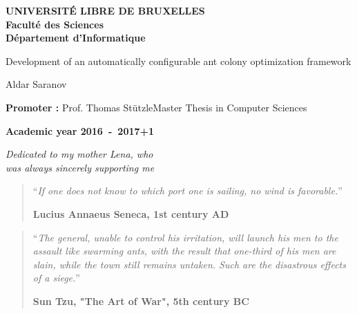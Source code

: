 \documentclass[11pt,a4paper,oneside]{book}
\begin{document}
\frontmatter
\begin{titlepage}
\begin{center}
\textbf{UNIVERSIT\'E LIBRE DE BRUXELLES}\\
\textbf{Facult\'e des Sciences}\\
\textbf{D\'epartement d'Informatique}
\vfill{}\vfill{}

{\Huge  Development of an automatically configurable ant colony optimization framework}

{\Huge \par}
\begin{center}{\LARGE Aldar Saranov}\end{center}{\Huge \par}
\vfill{}\vfill{}
\begin{flushright}{\large \textbf{Promoter :} Prof. Thomas St{\"u}tzle}\hfill{}{\large Master Thesis in Computer Sciences}\\
{\large }\hfill{}{}\end{flushright}{\large\par}
\vfill{}\vfill{}\enlargethispage{3cm}
\textbf{Academic year 2016~-~2017+1}
\end{center}
\end{titlepage}
\newpage
\thispagestyle{empty} 
\null

\newenvironment{vcenterpage}
{\newpage\thispagestyle{empty} 
\vspace*{\fill}}
{\vspace*{\fill}\par\pagebreak}

\begin{vcenterpage}
\begin{flushright}
    \large\em\null\vskip1in 
    Dedicated to my mother Lena, who\\
   was always sincerely supporting me\vfill
  \end{flushright}
\end{vcenterpage}
\thispagestyle{empty}
\vspace*{5cm}

\begin{quotation}
\noindent ``\emph{If one does not know to which port one is sailing, no wind is favorable.}''
\begin{flushright}\textbf{Lucius Annaeus Seneca, 1st century AD}\end{flushright}
\end{quotation}

\medskip

\begin{quotation}
\noindent ``\emph{The general, unable to control his irritation, will launch his men
to the assault like swarming ants, with the result that one-third of
his men are slain, while the town still remains untaken. Such are
the disastrous effects of a siege.}''
\begin{flushright}\textbf{Sun Tzu, "The Art of War", 5th century BC}\end{flushright}
\end{quotation}
\end{document}
